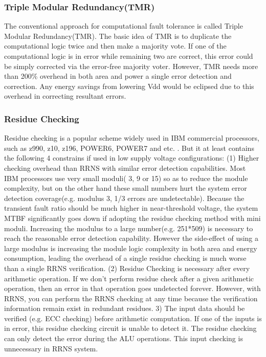 \documentclass{sig-alternate}
\begin{document}
\subsubsection{Triple Modular Redundancy(TMR)}
The conventional approach for computational fault tolerance is called Triple Modular Redundancy(TMR)\cite{von1956probabilistic}. 
The basic idea of TMR is to duplicate the computational logic twice and then make a majority vote. If one of the computational logic is in error while remaining two are correct, this error could be simply corrected via the error-free majority voter.  However, TMR needs more than 200\% overhead in both area and power a single error detection and correction. Any energy savings from lowering Vdd would be eclipsed due to this overhead in correcting resultant errors.

\subsubsection{Residue Checking}
Residue checking is a popular scheme widely used in IBM commercial processors, such as z990, z10, z196, POWER6, POWER7 and etc. \cite{ResidueCheck2011,IBMzEnterprise2011,Power6,Power7}. But it at least contains the following 4 constrains if used in low supply voltage configurations: 
(1) Higher checking overhead than RRNS with similar error detection capabilities. 
Most IBM processors use very small moduli( 3, 9 or 15) so as to reduce the module complexity, but on the other hand these small numbers hurt the system error detection coverage(e.g. modulus 3, 1/3 errors are undetectable). Because the transient fault ratio should be much higher in near-threshold voltage, the system MTBF significantly goes down if adopting the residue checking method with mini moduli. Increasing the modulus to a large number(e.g. 251*509) is necessary to reach the reasonable error detection capability. However the side-effect of using a large modulus is increasing the module logic complexity in both area and energy consumption, leading the overhead of a single residue checking is much worse than a single RRNS verification. 
(2) Residue Checking is necessary after every arithmetic operation.
If we don't perform residue check after a given arithmetic operation, then an error in that operation goes undetected forever. However, with RRNS, you can perform the RRNS checking at any time because the verification information remain exist in redundant residues.
3) The input data should be verified (e.g. ECC checking) before arithmetic computation.
If one of the inputs is in error, this residue checking circuit is unable to detect it. The residue checking can only detect the error during the ALU operations. This input checking is unnecessary in RRNS system. 
\end{document}

